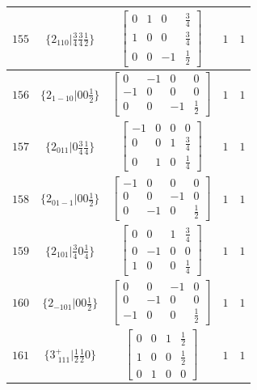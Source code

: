 \documentclass[fleqn,8pt]{jsarticle}
\begin{document}
\begin{longtable}{ccccc}
$ 155 $ & $ \{2{}_{110}|\frac{3}{4} \frac{3}{4} \frac{1}{2}\} $ & $ \begin{bmatrix} 0 & 1 & 0 & \frac{3}{4} \\ 1 & 0 & 0 & \frac{3}{4} \\ 0 & 0 & -1 & \frac{1}{2} \end{bmatrix} $ & $ 1 $ & $ 1 $ \\ \hline
$ 156 $ & $ \{2{}_{1-10}|0 0 \frac{1}{2}\} $ & $ \begin{bmatrix} 0 & -1 & 0 & 0 \\ -1 & 0 & 0 & 0 \\ 0 & 0 & -1 & \frac{1}{2} \end{bmatrix} $ & $ 1 $ & $ 1 $ \\ \hline
$ 157 $ & $ \{2{}_{011}|0 \frac{3}{4} \frac{1}{4}\} $ & $ \begin{bmatrix} -1 & 0 & 0 & 0 \\ 0 & 0 & 1 & \frac{3}{4} \\ 0 & 1 & 0 & \frac{1}{4} \end{bmatrix} $ & $ 1 $ & $ 1 $ \\ \hline
$ 158 $ & $ \{2{}_{01-1}|0 0 \frac{1}{2}\} $ & $ \begin{bmatrix} -1 & 0 & 0 & 0 \\ 0 & 0 & -1 & 0 \\ 0 & -1 & 0 & \frac{1}{2} \end{bmatrix} $ & $ 1 $ & $ 1 $ \\ \hline
$ 159 $ & $ \{2{}_{101}|\frac{3}{4} 0 \frac{1}{4}\} $ & $ \begin{bmatrix} 0 & 0 & 1 & \frac{3}{4} \\ 0 & -1 & 0 & 0 \\ 1 & 0 & 0 & \frac{1}{4} \end{bmatrix} $ & $ 1 $ & $ 1 $ \\ \hline
$ 160 $ & $ \{2{}_{-101}|0 0 \frac{1}{2}\} $ & $ \begin{bmatrix} 0 & 0 & -1 & 0 \\ 0 & -1 & 0 & 0 \\ -1 & 0 & 0 & \frac{1}{2} \end{bmatrix} $ & $ 1 $ & $ 1 $ \\ \hline
$ 161 $ & $ \{3^{+}_{\,\,111}|\frac{1}{2} \frac{1}{2} 0\} $ & $ \begin{bmatrix} 0 & 0 & 1 & \frac{1}{2} \\ 1 & 0 & 0 & \frac{1}{2} \\ 0 & 1 & 0 & 0 \end{bmatrix} $ & $ 1 $ & $ 1 $ \\ \hline

\end{longtable}
\end{document}
